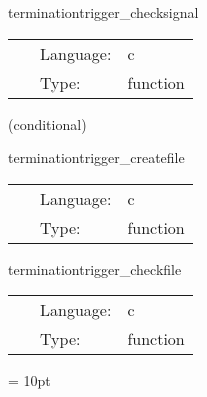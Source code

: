 \vspace{5mm}


\hspace{5mm} terminationtrigger\_checksignal 

\hspace{5mm}{\it check if we received a termination signal } 


\hspace{5mm}

 \begin{tabular*}{160mm}{cll} 
~ & Language:  & c \\ 
~ & Type:  & function \\ 
\end{tabular*} 


\vspace{5mm}

   (conditional) 

\hspace{5mm} terminationtrigger\_createfile 

\hspace{5mm}{\it create termination file } 


\hspace{5mm}

 \begin{tabular*}{160mm}{cll} 
~ & Language:  & c \\ 
~ & Type:  & function \\ 
\end{tabular*} 


\vspace{5mm}


\hspace{5mm} terminationtrigger\_checkfile 

\hspace{5mm}{\it check termination file } 


\hspace{5mm}

 \begin{tabular*}{160mm}{cll} 
~ & Language:  & c \\ 
~ & Type:  & function \\ 
\end{tabular*} 



\vspace{5mm}\parskip = 10pt 

